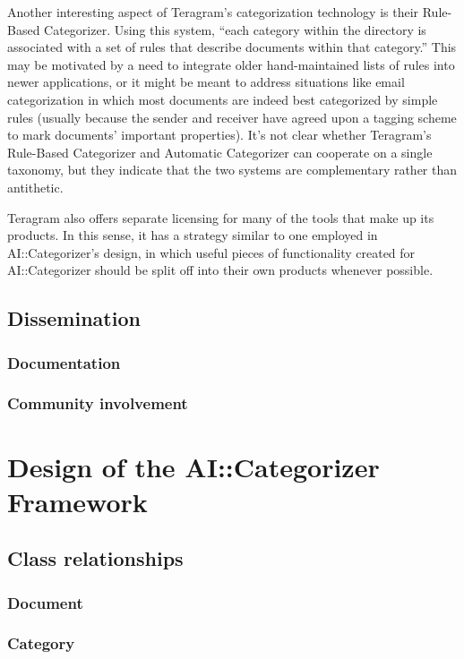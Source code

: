 \documentclass[a4paper]{report}
\begin{document}
Another interesting aspect of Teragram's categorization technology is
their Rule-Based Categorizer.  Using this system, ``each category
within the directory is associated with a set of rules that describe
documents within that category.''  This may be motivated by a need to
integrate older hand-maintained lists of rules into newer
applications, or it might be meant to address situations like email
categorization in which most documents are indeed best categorized by
simple rules (usually because the sender and receiver have agreed upon
a tagging scheme to mark documents' important properties).  It's not
clear whether Teragram's Rule-Based Categorizer and Automatic
Categorizer can cooperate on a single taxonomy, but they indicate that
the two systems are complementary rather than antithetic.

Teragram also offers separate licensing for many of the tools that
make up its products.  In this sense, it has a strategy similar to one
employed in AI::Categorizer's design, in which useful pieces of
functionality created for AI::Categorizer should be split off into
their own products whenever possible.

\section{Dissemination}
\subsection{Documentation}
\subsection{Community involvement}

\chapter{Design of the AI::Categorizer Framework}


\section{Class relationships}
\subsection{Document}
\subsection{Category}
\end{document}
